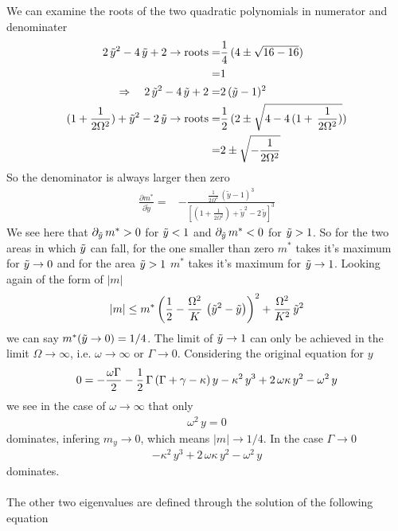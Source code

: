 \documentclass{article}
\begin{document}
We can examine the roots of the two quadratic polynomials in numerator and denominater
\begin{align*}
    2\,\tilde{y}^2-4\,\tilde{y}+2\rightarrow\text{roots}=&\frac{1}{4}\,(4\pm\sqrt{16-16})\\
    =&1\\
    \Rightarrow\quad 2\,\tilde{y}^2-4\,\tilde{y}+2=&2\,(\tilde{y}-1)^2\\
    (1+\frac{1}{2\Omega^2})+\tilde{y}^2-2\,\tilde{y}\rightarrow\text{roots}=&\frac{1}{2}\,(2\pm\sqrt{4-4\,(1+\,\frac{1}{2\Omega^2})})\\
    =&2\pm\sqrt{-\frac{1}{2\Omega^2}}
\end{align*}
So the denominator is always larger then zero
\begin{align*}
    \frac{\partial m^*}{\partial\tilde{y}}=&-\frac{\frac{1}{2\Omega^2}\,(\tilde{y}-1)^3}{\left[(1+\frac{1}{2\Omega^2})+\tilde{y}^2-2\,\tilde{y}\right]^3}
\end{align*}
We see here that $\partial_{\tilde{y}}\,m^*>0$ for $\tilde{y}<1$ and $\partial_{\tilde{y}}\,m^*<0$ for $\tilde{y}>1$. So for the two areas in which $\tilde{y}$ can fall, for the one smaller than zero $m^*$ takes it's maximum for $\tilde{y}\rightarrow0$ and for the area $\tilde{y}>1$ $m^*$ takes it's maximum for $\tilde{y}\rightarrow1$. Looking again of the form of $|m|$ 
\begin{align*}
    |m|\leq m^*\left( \frac{1}{2}-\frac{\Omega^2}{K}\,\left( \tilde{y}^2- \tilde{y} \right) \right)^2+\frac{\Omega^2}{K^2}\,\tilde{y}^2
\end{align*}
we can say $m^*(\tilde{y}\rightarrow0)=1/4$. The limit of $\tilde{y}\rightarrow1$ can only be achieved in the limit $\Omega\rightarrow\infty$, i.e. $\omega\rightarrow\infty$ or $\Gamma\rightarrow0$. Considering the original equation for $y$
\begin{align*}
    0=-\frac{\omega\Gamma}{2}-\frac{1}{2}\,\Gamma\,(\Gamma+\gamma-\kappa)\,y-\kappa^2\,y^3+2\,\omega\kappa\,y^2-\omega^2\,y
\end{align*}
we see in the case of $\omega\rightarrow\infty$ that only
\begin{align*}
    \omega^2\,y=0
\end{align*}
dominates, infering $m_y\rightarrow0$, which means $|m|\rightarrow1/4$. In the case $\Gamma\rightarrow0$
\begin{align*}
    -\kappa^2\,y^3+2\,\omega\kappa\,y^2-\omega^2\,y
\end{align*}
dominates. \\\\
The other two eigenvalues are defined through the solution of the following equation
\end{document}
